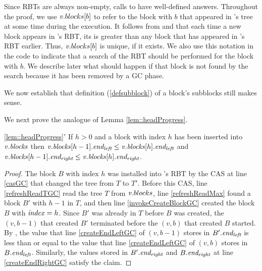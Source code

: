 Since RBTs are always non-empty, calls to  have well-defined answers.  
Throughout the proof, we use $\mbox{\textnormal{\textit{v}}}.blocks[b]$ to refer to the block with  $b$ that appeared
in 's tree at some time during the execution.
It follows from  and  that 
each time a new block appears in 's RBT, its  is greater than any block
that has appeared in 's RBT earlier.
Thus, $\mbox{\textnormal{\textit{v}}}.blocks[b]$ is unique, if it exists.
We also use this notation in the code to indicate that a search of the RBT should be performed for the block
with  $b$.
We describe later what should happen if that block is not found by the search because it has been removed
by a GC phase.

We now establish that definition (\ref{defsubblock}) of a block's subblocks
still makes sense.


We next prove the analogue of Lemma \ref{lem::headProgress}.
\begin{customlemma}{\ref{lem::headProgress}$'$}\label{lem::headProgressGC}
 If $h>0$ and a block with index $h$ has been inserted into $\mbox{\textnormal{\textit{v}}}.\mbox{\textit{blocks}}$ then 
 $\mbox{\textnormal{\textit{v}}}.\mbox{\textit{blocks}}[h-1].\mbox{\textit{end\textsubscript{left}}} \leq \mbox{\textnormal{\textit{v}}}.\mbox{\textit{blocks}}[h].\mbox{\textit{end\textsubscript{left}}}$ and 
 $\mbox{\textnormal{\textit{v}}}.\mbox{\textit{blocks}}[h-1].\mbox{\textit{end\textsubscript{right}}} \leq \mbox{\textnormal{\textit{v}}}.\mbox{\textit{blocks}}[h].\mbox{\textit{end\textsubscript{right}}}$.
\end{customlemma}
\begin{proof}
The block $B$ with index $h$ was installed into 's RBT by the CAS at line \ref{casGC} 
that changed the tree from $T$ to $T'$.
Before this CAS, line \ref{refreshReadTGC} read the tree $T$ from $\mbox{\textnormal{\textit{v}}}.blocks$,
line \ref{refreshReadMax} found a block $B'$  with  $h-1$ in $T$,
and then line \ref{invokeCreateBlockGC} created the block $B$ with $\mbox{\textit{index}}=h$.
Since $B'$ was already in $T$ before $B$ was created, the
$(v,b-1)$ that created $B'$ terminated before the 
$(v,b)$ that created $B$ started.
By , the value that line \ref{createEndLeftGC} of $(v,b-1)$ 
stores in $B'.\mbox{\textit{end\textsubscript{left}}}$ is less than or equal to the value that line \ref{createEndLeftGC} 
of $(v,b)$ stores in $B.\mbox{\textit{end\textsubscript{left}}}$.  
Similarly, the values stored in $B'.\mbox{\textit{end\textsubscript{right}}}$ and $B.\mbox{\textit{end\textsubscript{right}}}$ at line \ref{createEndRightGC} satisfy the claim.
\end{proof}

